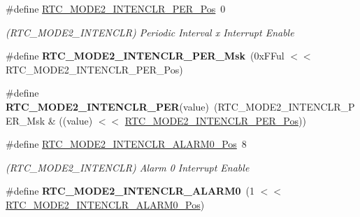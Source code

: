 \begin{DoxyCompactItemize}
\item 
\hypertarget{group___s_a_m_l21___r_t_c_gaf8098ab2e874feeea6e8f223f36bca96}{}\#define \hyperlink{group___s_a_m_l21___r_t_c_gaf8098ab2e874feeea6e8f223f36bca96}{R\+T\+C\+\_\+\+M\+O\+D\+E2\+\_\+\+I\+N\+T\+E\+N\+C\+L\+R\+\_\+\+P\+E\+R\+\_\+\+Pos}~0\label{group___s_a_m_l21___r_t_c_gaf8098ab2e874feeea6e8f223f36bca96}

\begin{DoxyCompactList}\small\item\em (R\+T\+C\+\_\+\+M\+O\+D\+E2\+\_\+\+I\+N\+T\+E\+N\+C\+L\+R) Periodic Interval x Interrupt Enable \end{DoxyCompactList}\item 
\hypertarget{group___s_a_m_l21___r_t_c_gac1aa260d959db5dce0d9f5a818361604}{}\#define {\bfseries R\+T\+C\+\_\+\+M\+O\+D\+E2\+\_\+\+I\+N\+T\+E\+N\+C\+L\+R\+\_\+\+P\+E\+R\+\_\+\+Msk}~(0x\+F\+Ful $<$$<$ R\+T\+C\+\_\+\+M\+O\+D\+E2\+\_\+\+I\+N\+T\+E\+N\+C\+L\+R\+\_\+\+P\+E\+R\+\_\+\+Pos)\label{group___s_a_m_l21___r_t_c_gac1aa260d959db5dce0d9f5a818361604}

\item 
\hypertarget{group___s_a_m_l21___r_t_c_ga9e4cad51fb6cc2c1714fb92a262fdfa3}{}\#define {\bfseries R\+T\+C\+\_\+\+M\+O\+D\+E2\+\_\+\+I\+N\+T\+E\+N\+C\+L\+R\+\_\+\+P\+E\+R}(value)~(R\+T\+C\+\_\+\+M\+O\+D\+E2\+\_\+\+I\+N\+T\+E\+N\+C\+L\+R\+\_\+\+P\+E\+R\+\_\+\+Msk \& ((value) $<$$<$ \hyperlink{group___s_a_m_l21___r_t_c_gaf8098ab2e874feeea6e8f223f36bca96}{R\+T\+C\+\_\+\+M\+O\+D\+E2\+\_\+\+I\+N\+T\+E\+N\+C\+L\+R\+\_\+\+P\+E\+R\+\_\+\+Pos}))\label{group___s_a_m_l21___r_t_c_ga9e4cad51fb6cc2c1714fb92a262fdfa3}

\item 
\hypertarget{group___s_a_m_l21___r_t_c_ga1bd76e52bbbdd0d857a3325a4af5a272}{}\#define \hyperlink{group___s_a_m_l21___r_t_c_ga1bd76e52bbbdd0d857a3325a4af5a272}{R\+T\+C\+\_\+\+M\+O\+D\+E2\+\_\+\+I\+N\+T\+E\+N\+C\+L\+R\+\_\+\+A\+L\+A\+R\+M0\+\_\+\+Pos}~8\label{group___s_a_m_l21___r_t_c_ga1bd76e52bbbdd0d857a3325a4af5a272}

\begin{DoxyCompactList}\small\item\em (R\+T\+C\+\_\+\+M\+O\+D\+E2\+\_\+\+I\+N\+T\+E\+N\+C\+L\+R) Alarm 0 Interrupt Enable \end{DoxyCompactList}\item 
\hypertarget{group___s_a_m_l21___r_t_c_ga389821976ff2412f8027aec23a86fca0}{}\#define {\bfseries R\+T\+C\+\_\+\+M\+O\+D\+E2\+\_\+\+I\+N\+T\+E\+N\+C\+L\+R\+\_\+\+A\+L\+A\+R\+M0}~(1 $<$$<$ \hyperlink{group___s_a_m_l21___r_t_c_ga1bd76e52bbbdd0d857a3325a4af5a272}{R\+T\+C\+\_\+\+M\+O\+D\+E2\+\_\+\+I\+N\+T\+E\+N\+C\+L\+R\+\_\+\+A\+L\+A\+R\+M0\+\_\+\+Pos})\label{group___s_a_m_l21___r_t_c_ga389821976ff2412f8027aec23a86fca0}


\end{DoxyCompactItemize}
